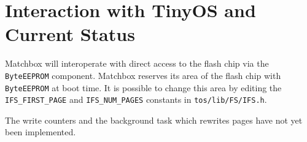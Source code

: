 \documentclass{article}
\newcommand{\kw}[1]{\mbox{\tt #1}}
\newcommand{\file}[1]{\mbox{\tt #1}}
\begin{document}
\section{Interaction with TinyOS and Current Status}

Matchbox will interoperate with direct access to the flash chip via the
\kw{ByteEEPROM} component. Matchbox reserves its area of the flash chip
with \kw{ByteEEPROM} at boot time. It is possible to change this area by
editing the \kw{IFS\_FIRST\_PAGE} and \kw{IFS\_NUM\_PAGES} constants in
\file{tos/lib/FS/IFS.h}.

The write counters and the background task which rewrites pages have not
yet been implemented.
\end{document}
